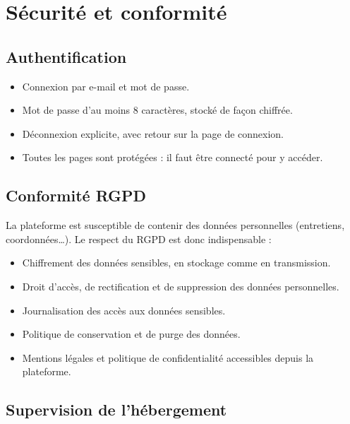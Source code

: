 \documentclass[a4paper,12pt,french]{article}
\begin{document}

\section{Sécurité et conformité}

\subsection{Authentification}

\begin{itemize}[leftmargin=1.5em]
  \item Connexion par e-mail et mot de passe.
  \item Mot de passe d'au moins 8 caractères, stocké de façon chiffrée.
  \item Déconnexion explicite, avec retour sur la page de connexion.
  \item Toutes les pages sont protégées : il faut être connecté pour y accéder.
\end{itemize}

\subsection{Conformité RGPD}

La plateforme est susceptible de contenir des données personnelles (entretiens, coordonnées\ldots). Le respect du RGPD est donc indispensable :

\begin{itemize}[leftmargin=1.5em]
  \item Chiffrement des données sensibles, en stockage comme en transmission.
  \item Droit d'accès, de rectification et de suppression des données personnelles.
  \item Journalisation des accès aux données sensibles.
  \item Politique de conservation et de purge des données.
  \item Mentions légales et politique de confidentialité accessibles depuis la plateforme.
\end{itemize}

\subsection{Supervision de l'hébergement}
\end{document}
